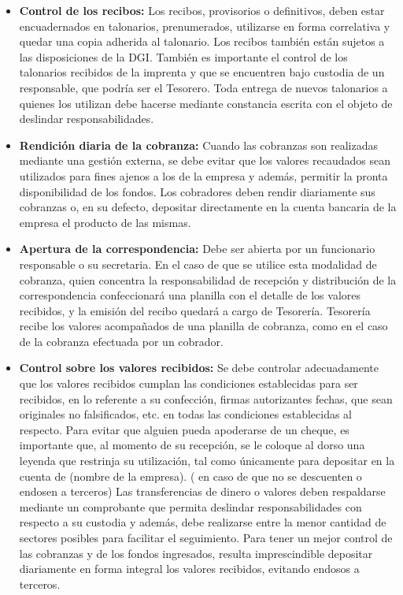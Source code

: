 \begin{itemize}

\item \textbf{Control de los recibos:}
Los recibos, provisorios o definitivos, deben estar encuadernados en talonarios, prenumerados,
utilizarse en forma correlativa y quedar una copia adherida al talonario. Los recibos también están sujetos a
las disposiciones de la DGI.
También es importante el control de los talonarios recibidos de la imprenta y que se encuentren bajo
custodia de un responsable, que podría ser el Tesorero. Toda entrega de nuevos talonarios a quienes los
utilizan debe hacerse mediante constancia escrita con el objeto de deslindar responsabilidades.

\item \textbf{Rendición diaria de la cobranza:}
Cuando las cobranzas son realizadas mediante una gestión externa, se debe evitar que los valores
recaudados sean utilizados para fines ajenos a los de la empresa y además, permitir la pronta
disponibilidad de los fondos. Los cobradores deben rendir diariamente sus cobranzas o, en su defecto,
depositar directamente en la cuenta bancaria de la empresa el producto de las mismas.

\item \textbf{Apertura de la correspondencia:}
Debe ser abierta por un funcionario responsable o su secretaria. En el caso de que se utilice esta
modalidad de cobranza, quien concentra la responsabilidad de recepción y distribución de la
correspondencia confeccionará una planilla con el detalle de los valores recibidos, y la emisión del recibo
quedará a cargo de Tesorería. Tesorería recibe los valores acompañados de una planilla de cobranza,
como en el caso de la cobranza efectuada por un cobrador.

\item \textbf{Control sobre los valores recibidos:}
Se debe controlar adecuadamente que los valores recibidos cumplan las condiciones establecidas
para ser recibidos, en lo referente a su confección, firmas autorizantes fechas, que sean originales no
falsificados, etc. en todas las condiciones establecidas al respecto.
Para evitar que alguien pueda apoderarse de un cheque, es importante que, al momento de su
recepción, se le coloque al dorso una leyenda que restrinja su utilización, tal como únicamente para
depositar en la cuenta de (nombre de la empresa). ( en caso de que no se descuenten o endosen a
terceros)
Las transferencias de dinero o valores deben respaldarse mediante un comprobante que permita
deslindar responsabilidades con respecto a su custodia y además, debe realizarse entre la menor cantidad
de sectores posibles para facilitar el seguimiento.
Para tener un mejor control de las cobranzas y de los fondos ingresados, resulta imprescindible
depositar diariamente en forma integral los valores recibidos, evitando endosos a terceros.


\end{itemize}

